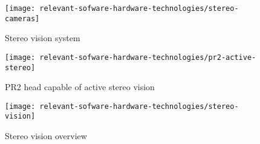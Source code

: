 \begin{figure}[H]
	\centering
	\texttt{[image: relevant-sofware-hardware-technologies/stereo-cameras]}
	\caption[Stereo vision system]{Stereo vision system \cite{Kaczurba2013}}
	\label{fig:relevant-sofware-hardware-technologies_stereo-cameras}
\end{figure}


\begin{figure}[H]
	\centering
	\texttt{[image: relevant-sofware-hardware-technologies/pr2-active-stereo]}
	\caption[PR2 head capable of active stereo vision]{PR2 head capable of active stereo vision\protect\footnotemark}
	\label{fig:relevant-sofware-hardware-technologies_pr2-active-stereo}
\end{figure}


\begin{figure}[hb]
	\centering
	\texttt{[image: relevant-sofware-hardware-technologies/stereo-vision]}
	\caption[Stereo vision overview]{Stereo vision overview \cite{Yang2014}}
	\label{fig:relevant-sofware-hardware-technologies_stereo-vision}
\end{figure}

